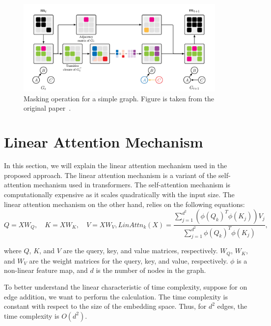 \documentclass{lxaiproposal}
\begin{document}
\begin{table}[h]
        \begin{figure}[h]
            \centering
            \includegraphics[width=0.92\textwidth]{figures/masking}
            \caption{Masking operation for a simple graph. Figure is taken from the original paper~\cite{deleu2022daggflownet}.}
            \label{fig:masking}
        \end{figure}


        \section{Linear Attention Mechanism}\label{app:linear_attention}
        \vspace*{-3mm}

        In this section, we will explain the linear attention mechanism used in the proposed approach. The linear attention
        mechanism is a variant of the self-attention mechanism used in transformers. The self-attention mechanism is
        computationally expensive as it scales quadratically with the input size. The linear attention mechanism on the
        other hand, relies on the following equations:
        \begin{equation}
            Q = XW_Q, \quad K = XW_K, \quad V = XW_V, LinAttn_k(X) = \frac{\sum_{j=1}^{d^2}
                \left(\phi(Q_k)^T\phi(K_j)\right)V_j}{\sum_{j=1}^{d^2} \phi(Q_k)^T\phi(K_j)},
            \label{eq:linear_attention}
        \end{equation}

        where $Q$, $K$, and $V$ are the query, key, and value matrices, respectively. $W_Q$, $W_K$, and $W_V$ are the
        weight matrices for the query, key, and value, respectively. $\phi$ is a non-linear feature map, and $d$ is the
        number of nodes in the graph.

        To better understand the linear characteristic of time complexity, suppose for on edge addition, we want to
        perform the calculation. The time complexity is constant with respect to the size of the embedding space. Thus,
        for $d^2$ edges, the time complexity is $O(d^2)$.



\end{table}
\end{document}
